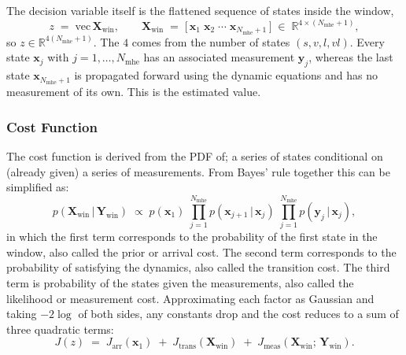 The decision variable itself is the flattened sequence of states inside the window,
\begin{equation}
    z \;=\; \mathrm{vec}\,\mathbf{X}_{\text{win}},
    \qquad
    \mathbf{X}_{\text{win}} \;=\; \bigl[\,\mathbf{x}_{1}\;\mathbf{x}_{2}\;\cdots\;\mathbf{x}_{N_{\text{mhe}}+1}\,\bigr] \;\in\; \mathbb{R}^{4\times(N_{\text{mhe}}+1)},
    \label{eq:est_decision}
\end{equation}
so $z\in\mathbb{R}^{4(N_{\text{mhe}}+1)}$. The $4$ comes from the number of states $(s,v,l,vl)$. Every state $\mathbf{x}_{j}$ with $j = 1,\ldots,N_{\text{mhe}}$ has an associated measurement $\mathbf{y}_{j}$, whereas the last state $\mathbf{x}_{N_{\text{mhe}}+1}$ is propagated forward using the dynamic equations and has no measurement of its own. This is the estimated value. 

\subsubsection{Cost Function}
\label{subsubsec:est_cost}

The cost function is derived from the PDF of; a series of states conditional on (already given) a series of measurements. From Bayes' rule together this can be simplified as:
\begin{equation}
    p(\mathbf{X}_{\text{win}}\,|\,\mathbf{Y}_{\text{win}})
    \;\propto\;
    p(\mathbf{x}_{1})
    \;\prod_{j=1}^{N_{\text{mhe}}} p(\mathbf{x}_{j+1}\,|\,\mathbf{x}_{j})
    \;\prod_{j=1}^{N_{\text{mhe}}} p(\mathbf{y}_{j}\,|\,\mathbf{x}_{j}),
    \label{eq:posterior_factor}
\end{equation}
in which the first term corresponds to the probability of the first state in the window, also called the prior or arrival cost. The second term corresponds to the probability of satisfying the dynamics, also called the transition cost. The third term is probability of the states given the measurements, also called the likelihood or measurement cost. Approximating each factor as Gaussian and taking $-2\log$ of both sides, any constants drop and the cost reduces to a sum of three quadratic terms:
\begin{equation}
    J(z) \;=\; J_{\text{arr}}(\mathbf{x}_{1}) \;+\; J_{\text{trans}}(\mathbf{X}_{\text{win}}) \;+\; J_{\text{meas}}(\mathbf{X}_{\text{win}};\,\mathbf{Y}_{\text{win}}).
    \label{eq:cost_total}
\end{equation}

